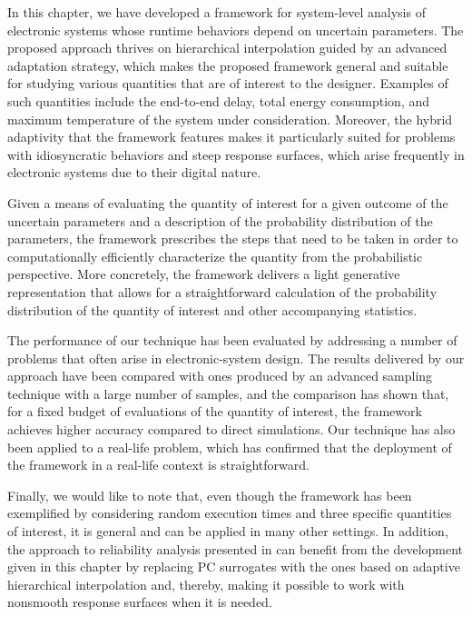 In this chapter, we have developed a framework for system-level analysis of
electronic systems whose runtime behaviors depend on uncertain parameters. The
proposed approach thrives on hierarchical interpolation guided by an advanced
adaptation strategy, which makes the proposed framework general and suitable for
studying various quantities that are of interest to the designer. Examples of
such quantities include the end-to-end delay, total energy consumption, and
maximum temperature of the system under consideration. Moreover, the hybrid
adaptivity that the framework features makes it particularly suited for problems
with idiosyncratic behaviors and steep response surfaces, which arise frequently
in electronic systems due to their digital nature.

Given a means of evaluating the quantity of interest for a given outcome of the
uncertain parameters and a description of the probability distribution of the
parameters, the framework prescribes the steps that need to be taken in order to
computationally efficiently characterize the quantity from the probabilistic
perspective. More concretely, the framework delivers a light generative
representation that allows for a straightforward calculation of the probability
distribution of the quantity of interest and other accompanying statistics.

The performance of our technique has been evaluated by addressing a number of
problems that often arise in electronic-system design. The results delivered by
our approach have been compared with ones produced by an advanced sampling
technique with a large number of samples, and the comparison has shown that, for
a fixed budget of evaluations of the quantity of interest, the framework
achieves higher accuracy compared to direct simulations. Our technique has also
been applied to a real-life problem, which has confirmed that the deployment of
the framework in a real-life context is straightforward.

Finally, we would like to note that, even though the framework has been
exemplified by considering random execution times and three specific quantities
of interest, it is general and can be applied in many other settings. In
addition, the approach to reliability analysis presented in
 can benefit from the development given in this
chapter by replacing \ac{PC} surrogates with the ones based on adaptive
hierarchical interpolation and, thereby, making it possible to work with
nonsmooth response surfaces when it is needed.
